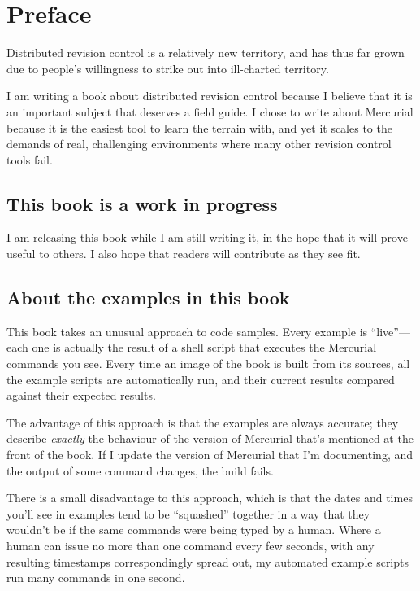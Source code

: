 \chapter*{Preface}
\label{chap:preface}

Distributed revision control is a relatively new territory, and has
thus far grown due to people's willingness to strike out into
ill-charted territory.

I am writing a book about distributed revision control because I
believe that it is an important subject that deserves a field guide.
I chose to write about Mercurial because it is the easiest tool to
learn the terrain with, and yet it scales to the demands of real,
challenging environments where many other revision control tools fail.

\section{This book is a work in progress}

I am releasing this book while I am still writing it, in the hope that
it will prove useful to others.  I also hope that readers will
contribute as they see fit.

\section{About the examples in this book}

This book takes an unusual approach to code samples.  Every example is
``live''---each one is actually the result of a shell script that
executes the Mercurial commands you see.  Every time an image of the
book is built from its sources, all the example scripts are
automatically run, and their current results compared against their
expected results.

The advantage of this approach is that the examples are always
accurate; they describe \emph{exactly} the behaviour of the version of
Mercurial that's mentioned at the front of the book.  If I update the
version of Mercurial that I'm documenting, and the output of some
command changes, the build fails.

There is a small disadvantage to this approach, which is that the
dates and times you'll see in examples tend to be ``squashed''
together in a way that they wouldn't be if the same commands were
being typed by a human.  Where a human can issue no more than one
command every few seconds, with any resulting timestamps
correspondingly spread out, my automated example scripts run many
commands in one second.

